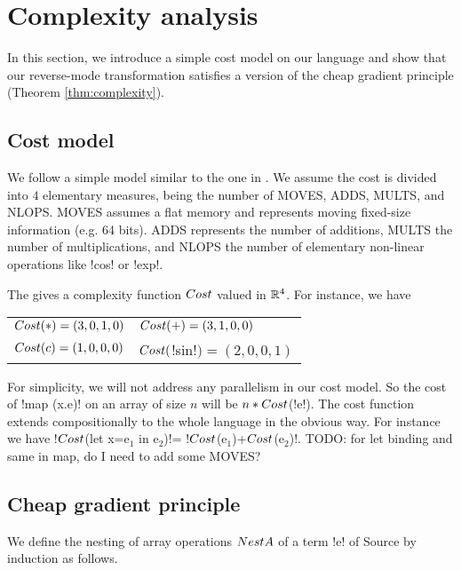 \section{Complexity analysis}
\label{sec:complexity}

In this section, we introduce a simple cost model on our language and show 
that our reverse-mode transformation satisfies a version of the cheap gradient principle (Theorem \ref{thm:complexity}).

\subsection{Cost model}
\label{sub:costModel}

We follow a simple model similar to the one in \cite{griewank2008evaluating}.
We assume the cost is divided into $4$ elementary measures, being the number of MOVES, ADDS, MULTS, and NLOPS.
MOVES assumes a flat memory and represents moving fixed-size information (e.g. 64 bits). 
ADDS represents the number of additions, 
MULTS the number of multiplications, 
and NLOPS the number of elementary non-linear operations like !cos! or !exp!.

The gives a complexity function $Cost$ valued in $\mathbb{R}^4$. 
For instance, we have 

\begin{tabular}{ll}
    $Cost(*)=(3,0,1,0)$ & $Cost(+)=(3,1,0,0)$\\
    $Cost(c)=(1,0,0,0)$ & $Cost($!sin!$)=(2,0,0,1)$
\end{tabular}

For simplicity, we will not address any parallelism in our cost model. 
So the cost of !map (x.e)! on an array of size $n$ will be $n*Cost$(!e!).
The cost function extends compositionally to the whole language in the obvious way.
For instance we have !$Cost$(let x=e$_1$ in e$_2$)!= !$Cost$(e$_1$)+$Cost$(e$_2$)!.
TODO: for let binding and same in map, do I need to add some MOVES?

\subsection{Cheap gradient principle}

We define the nesting of array operations $NestA$ of a term !e! of Source by induction as follows.

